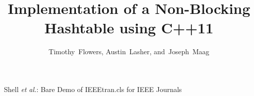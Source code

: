 \documentclass[journal]{IEEEtran}
\begin{document}
%
\title{Implementation of a Non-Blocking\\ Hashtable using C++11}
%
%
%

\author{Timothy~Flowers,
        Austin~Lasher,
        and~Joseph~Maag%
}

% 
%



{Shell \MakeLowercase{\textit{et al.}}: Bare Demo of IEEEtran.cls for IEEE Journals}
% 
\end{document}

